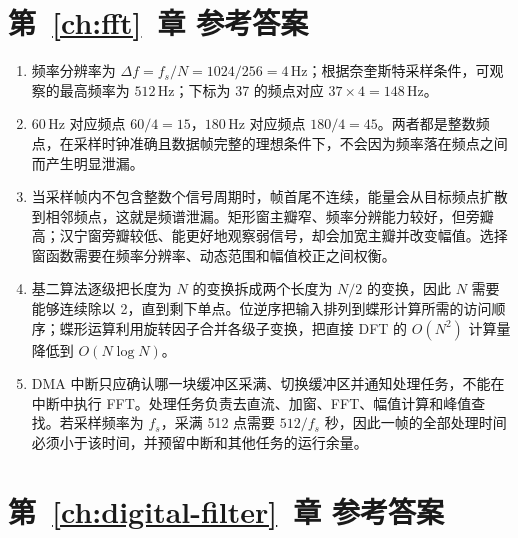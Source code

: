 \section*{第~\ref{ch:fft}~章 参考答案}

\begin{enumerate}
	\item 频率分辨率为 $\Delta f=f_s/N=1024/256=4\,\mathrm{Hz}$；根据奈奎斯特采样条件，可观察的最高频率为 $512\,\mathrm{Hz}$；下标为 37 的频点对应 $37\times4=148\,\mathrm{Hz}$。
	\item $60\,\mathrm{Hz}$ 对应频点 $60/4=15$，$180\,\mathrm{Hz}$ 对应频点 $180/4=45$。两者都是整数频点，在采样时钟准确且数据帧完整的理想条件下，不会因为频率落在频点之间而产生明显泄漏。
	\item 当采样帧内不包含整数个信号周期时，帧首尾不连续，能量会从目标频点扩散到相邻频点，这就是频谱泄漏。矩形窗主瓣窄、频率分辨能力较好，但旁瓣高；汉宁窗旁瓣较低、能更好地观察弱信号，却会加宽主瓣并改变幅值。选择窗函数需要在频率分辨率、动态范围和幅值校正之间权衡。
	\item 基二算法逐级把长度为 $N$ 的变换拆成两个长度为 $N/2$ 的变换，因此 $N$ 需要能够连续除以 2，直到剩下单点。位逆序把输入排列到蝶形计算所需的访问顺序；蝶形运算利用旋转因子合并各级子变换，把直接 DFT 的 $O(N^2)$ 计算量降低到 $O(N\log N)$。
	\item DMA 中断只应确认哪一块缓冲区采满、切换缓冲区并通知处理任务，不能在中断中执行 FFT。处理任务负责去直流、加窗、FFT、幅值计算和峰值查找。若采样频率为 $f_s$，采满 512 点需要 $512/f_s$ 秒，因此一帧的全部处理时间必须小于该时间，并预留中断和其他任务的运行余量。
\end{enumerate}

\section*{第~\ref{ch:digital-filter}~章 参考答案}

